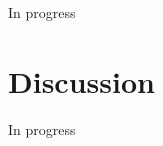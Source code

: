 \documentclass[twocolumn, linenumbers,trackchanges]{aastex7}
\begin{document}
In progress

\section{Discussion}

In progress




{}



\end{document}
